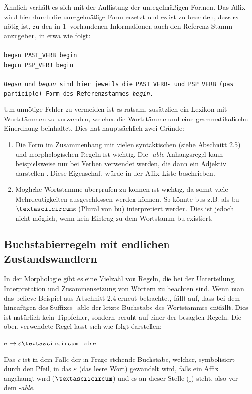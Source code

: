 \documentclass[12pt]{report}
\begin{document}
Ähnlich verhält es sich mit der Auflistung der unregelmäßigen Formen. Das Affix wird hier durch die unregelmäßige Form ersetzt und es ist zu beachten, dass es nötig ist, zu den in 1. vorhandenen Informationen auch den Referenz-Stamm anzugeben, in etwa wie folgt:
\\
\tt\\
began PAST\_VERB begin\\
begun PSP\_VERB begin\\
\rm\\
\textit{\glqq  Began\grqq{}} und \textit{\glqq  begun\grqq{}} sind hier jeweils die \glqq  PAST\_VERB\grqq{}- und \glqq  PSP\_VERB\grqq{} (past participle)-Form des Referenzstammes \textit{\glqq  begin\grqq{}}.

Um unnötige Fehler zu vermeiden ist es ratsam, zusätzlich ein Lexikon mit Wortstämmen zu verwenden, welches die Wortstämme und eine grammatikalische Einordnung beinhaltet. Dies hat hauptsächlich zwei Gründe: 

\begin{enumerate}
\item Die Form im Zusammenhang mit vielen syntaktischen (siehe Abschnitt 2.5) und morphologischen Regeln ist wichtig. Die \textit{\glqq  -able\grqq{}}-Anhangsregel kann beispielsweise nur bei Verben verwendet werden, die dann ein Adjektiv darstellen . Diese Eigenschaft würde in der Affix-Liste beschrieben.
\item Mögliche Wortstämme überprüfen zu können ist wichtig, da somit viele Mehrdeutigkeiten ausgeschlossen werden können. So könnte \glqq  bus\grqq{} z.B. als \glqq  bu$\textasciicircum$s\grqq{} (Plural von \glqq  bu\grqq{}) interpretiert werden. Dies ist jedoch nicht möglich, wenn kein Eintrag zu dem Wortstamm \glqq  bu\grqq{} existiert. 
\end{enumerate}

\subsection{Buchstabierregeln mit endlichen\\ Zustandswandlern}
In der Morphologie gibt es eine Vielzahl von Regeln, die bei der Unterteilung, Interpretation und Zusammensetzung von Wörtern zu beachten sind. Wenn man das \glqq  believe\grqq{}-Beispiel aus Abschnitt 2.4 erneut betrachtet, fällt auf, dass bei dem hinzufügen des Suffixes \glqq  -able\grqq{} der letzte Buchstabe des Wortstammes entfällt. Dies ist natürlich kein Tippfehler, sondern beruht auf einer der besagten Regeln. Die oben verwendete Regel lässt sich wie folgt darstellen:
\tt
\begin{center}
e $\rightarrow \varepsilon \textasciicircum \_$able
\end{center}
\rm
Das \textit{e} ist in dem Falle der in Frage stehende Buchstabe, welcher, symbolisiert durch den Pfeil, in das $\varepsilon$ (das leere Wort) gewandelt wird, falls ein Affix angehängt wird ($\textasciicircum$) und es an dieser Stelle ($\_$) steht, also vor dem \textit{\glqq  -able\grqq{}}.
\end{document}
